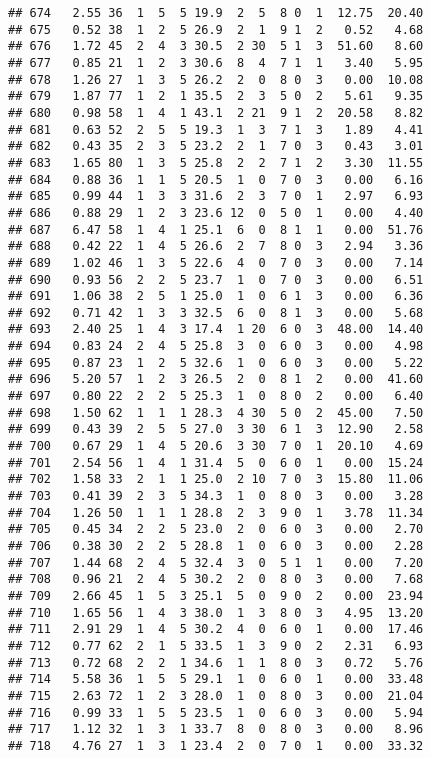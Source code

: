 \documentclass[
]{article}
\begin{document}
\begin{verbatim}
## 674   2.55 36  1  5  5 19.9  2  5  8 0  1  12.75  20.40
## 675   0.52 38  1  2  5 26.9  2  1  9 1  2   0.52   4.68
## 676   1.72 45  2  4  3 30.5  2 30  5 1  3  51.60   8.60
## 677   0.85 21  1  2  3 30.6  8  4  7 1  1   3.40   5.95
## 678   1.26 27  1  3  5 26.2  2  0  8 0  3   0.00  10.08
## 679   1.87 77  1  2  1 35.5  2  3  5 0  2   5.61   9.35
## 680   0.98 58  1  4  1 43.1  2 21  9 1  2  20.58   8.82
## 681   0.63 52  2  5  5 19.3  1  3  7 1  3   1.89   4.41
## 682   0.43 35  2  3  5 23.2  2  1  7 0  3   0.43   3.01
## 683   1.65 80  1  3  5 25.8  2  2  7 1  2   3.30  11.55
## 684   0.88 36  1  1  5 20.5  1  0  7 0  3   0.00   6.16
## 685   0.99 44  1  3  3 31.6  2  3  7 0  1   2.97   6.93
## 686   0.88 29  1  2  3 23.6 12  0  5 0  1   0.00   4.40
## 687   6.47 58  1  4  1 25.1  6  0  8 1  1   0.00  51.76
## 688   0.42 22  1  4  5 26.6  2  7  8 0  3   2.94   3.36
## 689   1.02 46  1  3  5 22.6  4  0  7 0  3   0.00   7.14
## 690   0.93 56  2  2  5 23.7  1  0  7 0  3   0.00   6.51
## 691   1.06 38  2  5  1 25.0  1  0  6 1  3   0.00   6.36
## 692   0.71 42  1  3  3 32.5  6  0  8 1  3   0.00   5.68
## 693   2.40 25  1  4  3 17.4  1 20  6 0  3  48.00  14.40
## 694   0.83 24  2  4  5 25.8  3  0  6 0  3   0.00   4.98
## 695   0.87 23  1  2  5 32.6  1  0  6 0  3   0.00   5.22
## 696   5.20 57  1  2  3 26.5  2  0  8 1  2   0.00  41.60
## 697   0.80 22  2  2  5 25.3  1  0  8 0  2   0.00   6.40
## 698   1.50 62  1  1  1 28.3  4 30  5 0  2  45.00   7.50
## 699   0.43 39  2  5  5 27.0  3 30  6 1  3  12.90   2.58
## 700   0.67 29  1  4  5 20.6  3 30  7 0  1  20.10   4.69
## 701   2.54 56  1  4  1 31.4  5  0  6 0  1   0.00  15.24
## 702   1.58 33  2  1  1 25.0  2 10  7 0  3  15.80  11.06
## 703   0.41 39  2  3  5 34.3  1  0  8 0  3   0.00   3.28
## 704   1.26 50  1  1  1 28.8  2  3  9 0  1   3.78  11.34
## 705   0.45 34  2  2  5 23.0  2  0  6 0  3   0.00   2.70
## 706   0.38 30  2  2  5 28.8  1  0  6 0  3   0.00   2.28
## 707   1.44 68  2  4  5 32.4  3  0  5 1  1   0.00   7.20
## 708   0.96 21  2  4  5 30.2  2  0  8 0  3   0.00   7.68
## 709   2.66 45  1  5  3 25.1  5  0  9 0  2   0.00  23.94
## 710   1.65 56  1  4  3 38.0  1  3  8 0  3   4.95  13.20
## 711   2.91 29  1  4  5 30.2  4  0  6 0  1   0.00  17.46
## 712   0.77 62  2  1  5 33.5  1  3  9 0  2   2.31   6.93
## 713   0.72 68  2  2  1 34.6  1  1  8 0  3   0.72   5.76
## 714   5.58 36  1  5  5 29.1  1  0  6 0  1   0.00  33.48
## 715   2.63 72  1  2  3 28.0  1  0  8 0  3   0.00  21.04
## 716   0.99 33  1  5  5 23.5  1  0  6 0  3   0.00   5.94
## 717   1.12 32  1  3  1 33.7  8  0  8 0  3   0.00   8.96
## 718   4.76 27  1  3  1 23.4  2  0  7 0  1   0.00  33.32

\end{verbatim}
\end{document}
